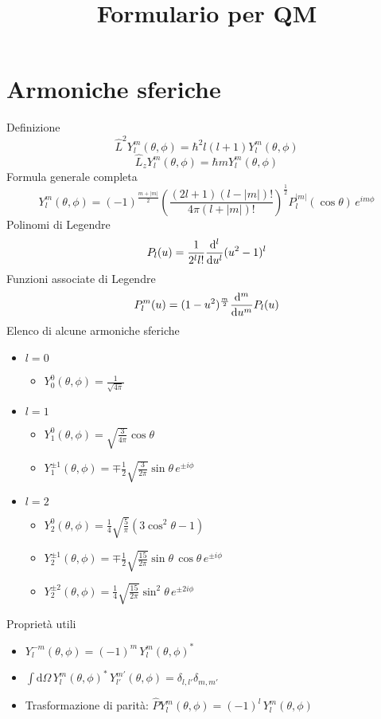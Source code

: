 \documentclass{article}
\title{Formulario per QM}
\newcommand{\deh}{\mathrm{d}}
\newcommand{\onehalf}{\frac{1}{2}}
\newcommand{\der}[2][1]{\if 1#1 \frac{\deh}{\deh #2} \else \frac{\deh^#1}{\deh #2^#1} \fi}
\begin{document}
\maketitle

\section{Armoniche sferiche}
Definizione
\[\hat{L}^2Y_l^m(\theta,\phi)=\hbar^2 l(l+1) Y_l^m(\theta,\phi)\]
\[\hat{L}_zY_l^m(\theta,\phi)=\hbar m Y_l^m(\theta,\phi)\]
Formula generale completa
\[Y_l^m(\theta,\phi)=(-1)^\frac{m+|m|}{2}\left(\frac{(2l+1)(l-|m|)!}{4\pi (l+|m|)!}\right)^{\onehalf} P_l^{|m|}(\cos\theta)\,e^{im\phi}\]
Polinomi di Legendre \[P_l(u)=\frac{1}{2^l l!} \der[l]{u}(u^2-1)^l\]
Funzioni associate di Legendre \[P_l^m(u)=(1-u^2)^{\frac{m}{2}} \der[m]{u}P_l(u)\]
Elenco di alcune armoniche sferiche
\begin{itemize}
    \item $l=0$ 
    \begin{itemize}
        \item[] $Y_0^0(\theta,\phi)=\frac{1}{\sqrt{4\pi}}$
    \end{itemize}
    \item $l=1$
    \begin{itemize}
        \item[] $Y_1^0(\theta,\phi)=\sqrt{\frac{3}{4\pi}}\cos\theta$
        \item[] $Y_1^{\pm 1}(\theta,\phi)=\mp\frac{1}{2}\sqrt{\frac{3}{2\pi}}\sin\theta\,e^{\pm i\phi}$
    \end{itemize}
    \item $l=2$
    \begin{itemize}
        \item[] $Y_2^0(\theta,\phi)=\frac{1}{4}\sqrt{\frac{5}{\pi}}(3 \cos^2\theta-1)$
        \item[] $Y_2^{\pm 1}(\theta,\phi)=\mp\frac{1}{2}\sqrt{\frac{15}{2\pi}}\sin\theta\,\cos\theta\,e^{\pm i\phi}$
        \item[] $Y_2^{\pm 2}(\theta,\phi)=\frac{1}{4}\sqrt{\frac{15}{2\pi}}\sin^2\theta\,e^{\pm2i\phi}$
    \end{itemize}
\end{itemize}
Proprietà utili
\begin{itemize}
    \item[] $Y_l^{-m}(\theta,\phi)=(-1)^m\, Y_l^m(\theta,\phi)^*$
    \item[] $\int \deh\Omega\, Y_l^m(\theta,\phi)^*\,Y_{l'}^{m'}(\theta,\phi)=\delta_{l,l'}\delta_{m,m'} $ 
    \item[] Trasformazione di parità: \quad $\hat{P} Y_l^m(\theta,\phi)=(-1)^l \,Y_l^m(\theta,\phi)$
\end{itemize}
\end{document}

